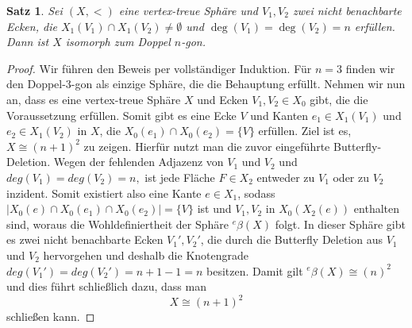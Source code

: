 \documentclass[12pt,titlepage,twoside,cleardoublepage]{article}
\theoremstyle{nummermitklammern}
\newtheorem{satz}[temp]{Satz}
\newtheorem{satz}[zahl]{Satz}
\numberwithin{equation}{section}
\begin{document}
\begin{satz}\label{ngon}
Sei $(X,<)$ eine vertex-treue Sphäre und $V_1,V_2$ zwei nicht benachbarte Ecken, die  $X_1(V_1)\cap X_1(V_2)\neq \emptyset$ und $\deg(V_1)=\deg(V_2)= n$ erfüllen. Dann ist $X$ isomorph zum Doppel $n$-gon.
\end{satz}
\begin{proof}
Wir  führen den Beweis per vollständiger Induktion. Für $n=3$ finden wir den Doppel-3-gon als einzige Sphäre, die die Behauptung erfüllt. Nehmen wir nun an, dass es eine vertex-treue Sphäre $X$ und Ecken $V_1,V_2\in X_0$ gibt, die die Voraussetzung erfüllen. Somit gibt es eine Ecke $V$ und Kanten $e_1\in X_1(V_1)$ und $e_2 \in X_1(V_2)$ in $X$, die $X_0(e_1)\cap X_0(e_2)=\{V\}$ erfüllen.
 Ziel ist es, $X\cong (n+1)^2$ zu zeigen. Hierfür nutzt man die zuvor eingeführte Butterfly-Deletion. Wegen der fehlenden Adjazenz von $V_1$ und $V_2$ und $deg(V_1)=deg(V_2)= n,$ ist jede Fläche $F\in X_2$ entweder zu $V_1$ oder zu $V_2$ inzident. Somit existiert also eine Kante $e\in X_1$, sodass $\vert X_0(e)\cap X_0(e_1)\cap X_0(e_2)\vert  =\{V\}$
 ist und $V_1,V_2$ in $X_0(X_2(e))$ enthalten sind, woraus die Wohldefiniertheit der Sphäre ${{}^e\beta(X)}$ folgt. In dieser Sphäre gibt es zwei nicht benachbarte Ecken $V_1',V_2'$, die durch die Butterfly Deletion aus $V_1$ und $V_2$ hervorgehen und deshalb die Knotengrade $deg(V_1')=deg(V_2')=n+1-1=n$ besitzen. Damit gilt ${{}^e\beta(X)}\cong (n)^2$ und dies führt schließlich dazu, dass man
 \[
X\cong (n+1)^2 
 \]
 schließen kann.
\end{proof}
\end{document}
